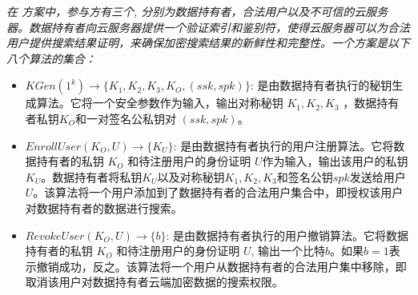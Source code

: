 \begin{definition}\label{def:multi}
  {\itshape
      在 \multi 方案中，参与方有三个, 分别为数据持有者，合法用户以及不可信的云服务器。数据持有者向云服务器提供一个验证索引和鉴别符，使得云服务器可以为合法用户提供搜索结果证明，来确保加密搜索结果的新鲜性和完整性。一个\multi 方案是以下八个算法的集合：
      \begin{itemize}
        \item $KGen(1^k) \rightarrow \{K_1,K_2,K_3,K_O, (ssk, spk)\}$: 是由数据持有者执行的秘钥生成算法。它将一个安全参数作为输入，输出对称秘钥 $K_1,K_2,K_3$ ，数据持有者私钥$K_O$和一对签名公私钥对 $(ssk, spk)$。
        \item $EnrollUser(K_O,U) \rightarrow \{K_U\}$: 是由数据持有者执行的用户注册算法。它将数据持有者的私钥 $K_O$ 和待注册用户的身份证明 $U$作为输入，输出该用户的私钥$K_U$。数据持有者将私钥$K_U$以及对称秘钥$K_1,K_2,K_3$和签名公钥$spk$发送给用户$U$。该算法将一个用户添加到了数据持有者的合法用户集合中，即授权该用户对数据持有者的数据进行搜索。
        \item $RevokeUser(K_O,U) \rightarrow \{b\}$: 是由数据持有者执行的用户撤销算法。它将数据持有者的私钥 $K_O$ 和待注册用户的身份证明 $U$, 输出一个比特$b$。如果$b=1$表示撤销成功，反之。该算法将一个用户从数据持有者的合法用户集中移除，即取消该用户对数据持有者云端加密数据的搜索权限。


\end{itemize}}
\end{definition}
